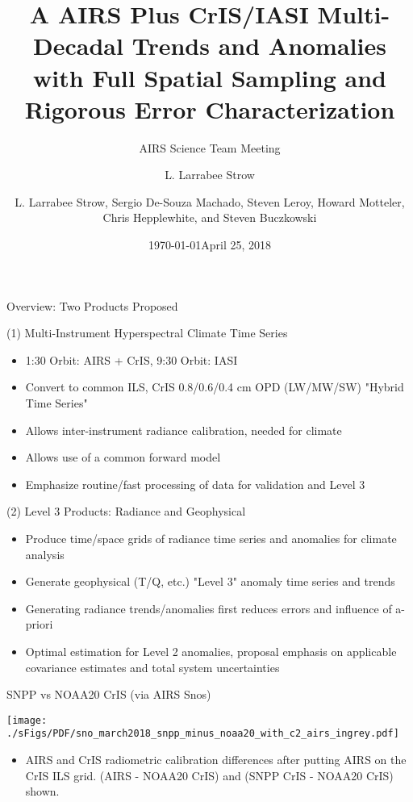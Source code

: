 \documentclass[10pt,t]{beamer}
\author{L. Larrabee Strow}
\date{\today}
\title{\large A AIRS Plus CrIS/IASI Multi-Decadal Trends and Anomalies with Full Spatial Sampling and Rigorous Error Characterization}
\subtitle{\footnotesize{AIRS Science Team Meeting}}
\date{\vspace{0.1in}\footnotesize{April 25, 2018 \vfill}}
\author{L. Larrabee Strow\inst{1,2}, Sergio De-Souza Machado\inst{1,2}, Steven Leroy\inst{3}, Howard Motteler\inst{2}, Chris Hepplewhite\inst{2}, and Steven Buczkowski\inst{2}}
\institute[UMBC]{\inst{1} UMBC Physics Dept. \and \inst{2}UMBC JCET \and \inst{3} AER}
\begin{document}
\maketitle
{}

\begin{frame}[shrink=10,label={sec:org79eb4bf}]{Overview:  Two Products Proposed}
\vspace{-0.1in}
\begin{block}{(1) Multi-Instrument Hyperspectral Climate Time Series}
\begin{itemize}
\item 1:30 Orbit: AIRS + CrIS, 9:30 Orbit: IASI
\item Convert to common ILS, CrIS 0.8/0.6/0.4 cm OPD (LW/MW/SW) "Hybrid Time Series"
\item Allows inter-instrument radiance calibration, needed for climate
\item Allows use of a common forward model
\item Emphasize routine/fast processing of data for validation and Level 3
\end{itemize}
\end{block}

\begin{block}{(2) Level 3 Products: Radiance and Geophysical}
\begin{itemize}
\item Produce time/space grids of radiance time series and anomalies for climate analysis
\item Generate geophysical (T/Q, etc.) "Level 3" anomaly time series and trends
\item Generating radiance trends/anomalies first reduces errors and influence of a-priori
\item Optimal estimation for Level 2 anomalies, proposal emphasis on applicable covariance estimates and total system uncertainties
\end{itemize}
\end{block}
\end{frame}

\begin{frame}[label={sec:orge097dda}]{SNPP vs NOAA20 CrIS (via AIRS Snos)}
\vspace{-0.1in}

\begin{center}
\texttt{[image: ./sFigs/PDF/sno\_march2018\_snpp\_minus\_noaa20\_with\_c2\_airs\_ingrey.pdf]}
\end{center}

\vspace{-0.1in}

\small
\begin{itemize}
\item AIRS and CrIS radiometric calibration differences after putting AIRS on the CrIS ILS grid.  (AIRS - NOAA20 CrIS) and (SNPP CrIS - NOAA20 CrIS) shown.
\end{itemize}
\end{frame}
\end{document}
